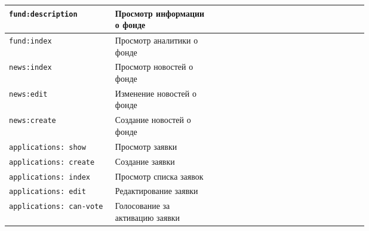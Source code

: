 \begin{center}
\begin{longtable}{|p{0.2\linewidth}|p{0.2\linewidth}|p{0.05\linewidth}|p{0.05\linewidth}|p{0.05\linewidth}|p{0.05\linewidth}|p{0.05\linewidth}|p{0.05\linewidth}|}
\texttt{fund:description} & Просмотр информации о фонде & {\color{red}{НЕТ}} & {\color{green}{ДА}} & {\color{red}{НЕТ}} & {\color{red}{НЕТ}} & {\color{green}{ДА}} & {\color{green}{ДА}} \\ \hline

\texttt{fund:index} & Просмотр аналитики о фонде & {\color{red}{НЕТ}} & {\color{green}{ДА}} & {\color{red}{НЕТ}} & {\color{red}{НЕТ}} &  {\color{red}{НЕТ}} &  {\color{red}{НЕТ}} \\ \hline

\texttt{news:index} & Просмотр новостей о фонде & {\color{red}{НЕТ}} & {\color{red}{НЕТ}} & {\color{red}{НЕТ}} & {\color{red}{НЕТ}} & {\color{green}{ДА}} &  {\color{red}{НЕТ}} \\ \hline

\texttt{news:edit} & Изменение новостей о фонде & {\color{red}{НЕТ}} & {\color{red}{НЕТ}} & {\color{red}{НЕТ}} & {\color{red}{НЕТ}} & {\color{green}{ДА}} &  {\color{red}{НЕТ}} \\ \hline

\texttt{news:create} & Создание новостей о фонде & {\color{red}{НЕТ}} & {\color{red}{НЕТ}} & {\color{red}{НЕТ}} & {\color{red}{НЕТ}} & {\color{green}{ДА}} &  {\color{red}{НЕТ}} \\ \hline

\texttt{applications: show} & Просмотр заявки & {\color{red}{НЕТ}} & {\color{green}{ДА}} & {\color{green}{ДА}} & {\color{red}{НЕТ}} &  {\color{green}{ДА}} &  {\color{red}{НЕТ}} \\ \hline

\texttt{applications: create} & Создание заявки & {\color{red}{НЕТ}} & {\color{green}{ДА}} & {\color{green}{ДА}} & {\color{red}{НЕТ}} &  {\color{red}{НЕТ}} &  {\color{red}{НЕТ}} \\ \hline


\texttt{applications: index} & Просмотр списка заявок & {\color{red}{НЕТ}} & {\color{green}{ДА}} & {\color{green}{ДА}} & {\color{red}{НЕТ}} &  {\color{red}{НЕТ}} &  {\color{red}{НЕТ}} \\ \hline

\texttt{applications: edit} & Редактирование заявки & {\color{red}{НЕТ}} & {\color{green}{ДА}} & {\color{green}{ДА}} & {\color{red}{НЕТ}} &  {\color{red}{НЕТ}} &  {\color{red}{НЕТ}} \\ \hline

\texttt{applications: can-vote} & Голосование за активацию заявки & {\color{red}{НЕТ}} & {\color{green}{ДА}} & {\color{red}{НЕТ}} & {\color{red}{НЕТ}} &  {\color{red}{НЕТ}} &  {\color{red}{НЕТ}} \\ \hline


\end{longtable}
\end{center}

